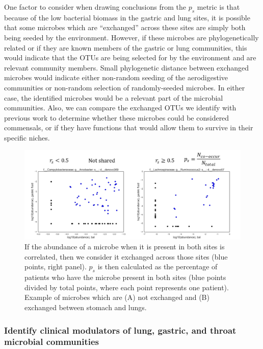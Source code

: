 \documentclass[12pt]{article}
\begin{document}
One factor to consider when drawing conclusions from the $p_s$ metric 
is that because of the low bacterial biomass in the gastric and lung 
sites, it is possible that some microbes which are ``exchanged'' across 
these sites are simply both being seeded by the environment. However, 
if these microbes are phylogenetically related or if they are known 
members of the gastric or lung communities, this would indicate that 
the OTUs are being selected for by the environment and are relevant 
community members. Small phylogenetic distance between exchanged microbes
would indicate either non-random seeding of the aerodigestive communities 
or non-random selection of randomly-seeded microbes. In either case, the
identified microbes would be a relevant part of the microbial communities.
Also, we can compare the exchanged OTUs we identify with previous work
to determine whether these microbes could be considered commensals, or
if they have functions that would allow them to survive in their specific niches.

\begin{figure}
\begin{center}
    \includegraphics[scale=0.6]{sharedness_definition}
    \caption{If the abundance of a microbe when it is 
    present in both sites is correlated, then we consider it exchanged 
    across those sites (blue points, right panel). $p_s$ is then calculated as the 
    percentage of patients who have the microbe present in both sites (blue 
    points divided by total points, where each point represents one patient). 
    Example of microbes which are (A) not exchanged and (B) exchanged between stomach and lungs.}\label{fig:sharedness_defn}
\end{center}
\end{figure}

\subsubsection{Identify clinical modulators of lung, gastric, and throat microbial communities}
\end{document}
